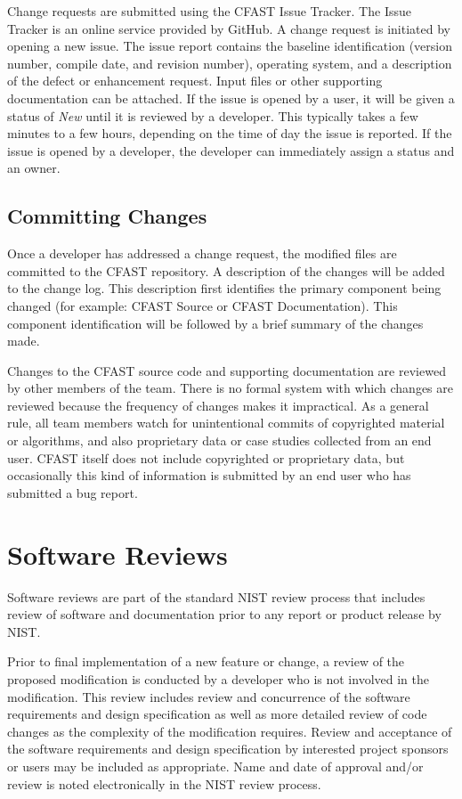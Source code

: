 \documentclass[12pt]{book}
\begin{document}
Change requests are submitted using the CFAST Issue Tracker.  The Issue Tracker is an online service provided by GitHub. A change request is initiated by opening a new issue.  The issue report contains the baseline identification (version number, compile date, and revision number), operating system, and a description of the defect or enhancement request.  Input files or other supporting documentation can be attached. If the issue is opened by a user, it will be given a status of {\em New} until it is reviewed by a developer. This typically takes a few minutes to a few hours, depending on the time of day the issue is reported. If the issue is opened by a developer, the developer can immediately assign a status and an owner.


\subsection{Committing Changes}

Once a developer has addressed a change request, the modified files are committed to the CFAST repository.  A description of the changes will be added to the change log.  This description first identifies the primary component being changed (for example: CFAST Source or CFAST Documentation).  This component identification will be followed by a brief summary of the changes made.

Changes to the CFAST source code and supporting documentation are reviewed by other members of the team. There is no formal system with which changes are reviewed because the frequency of changes makes it impractical. As a general rule, all team members watch for unintentional commits of copyrighted material or algorithms, and also proprietary data or case studies collected from an end user. CFAST itself does not include copyrighted or proprietary data, but occasionally this kind of information is submitted by an end user who has submitted a bug report.

\section{Software Reviews}

Software reviews are  part of the standard NIST review process that includes review of software and documentation prior to any report or product release by NIST.

Prior to final implementation of a new feature or change, a review of the proposed modification is conducted by a developer who is not involved in the modification.  This review includes review and concurrence of the software requirements and design specification as well as more detailed review of code changes as the complexity of the modification requires. Review and acceptance of the software requirements and design specification by interested project sponsors or users may be included as appropriate. Name and date of approval and/or review is noted electronically in the NIST review process.
\end{document}
